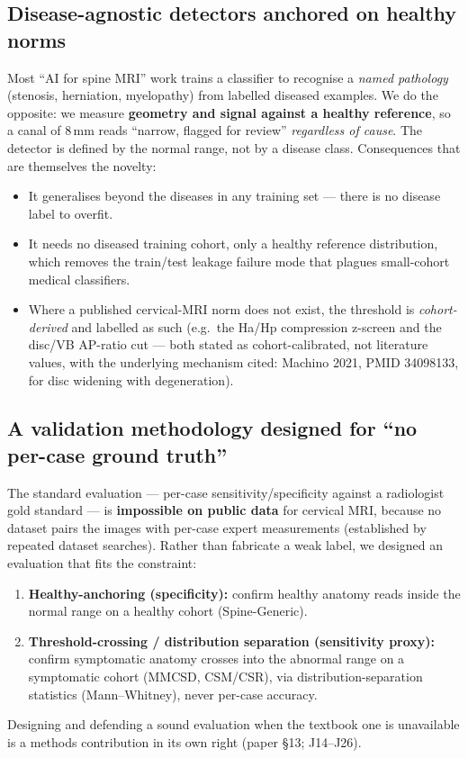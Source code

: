 \documentclass[11pt]{article}
\begin{document}
\subsection{Disease-agnostic detectors anchored on healthy norms}
Most ``AI for spine MRI'' work trains a classifier to recognise a \emph{named pathology} (stenosis,
herniation, myelopathy) from labelled diseased examples. We do the opposite: we measure
\textbf{geometry and signal against a healthy reference}, so a canal of $8$\,mm reads ``narrow,
flagged for review'' \emph{regardless of cause}. The detector is defined by the normal range, not by a
disease class. Consequences that are themselves the novelty:
\begin{itemize}
  \item It generalises beyond the diseases in any training set --- there is no disease label to overfit.
  \item It needs no diseased training cohort, only a healthy reference distribution, which removes the
  train/test leakage failure mode that plagues small-cohort medical classifiers.
  \item Where a published cervical-MRI norm does not exist, the threshold is \emph{cohort-derived} and
  labelled as such (e.g.\ the Ha/Hp compression z-screen and the disc/VB AP-ratio cut --- both stated as
  cohort-calibrated, not literature values, with the underlying mechanism cited: Machino 2021,
  PMID 34098133, for disc widening with degeneration).
\end{itemize}

\subsection{A validation methodology designed for ``no per-case ground truth''}
The standard evaluation --- per-case sensitivity/specificity against a radiologist gold standard --- is
\textbf{impossible on public data} for cervical MRI, because no dataset pairs the images with per-case
expert measurements (established by repeated dataset searches). Rather than fabricate a weak label, we
designed an evaluation that fits the constraint:
\begin{enumerate}
  \item \textbf{Healthy-anchoring (specificity):} confirm healthy anatomy reads inside the normal range
  on a healthy cohort (Spine-Generic).
  \item \textbf{Threshold-crossing / distribution separation (sensitivity proxy):} confirm symptomatic
  anatomy crosses into the abnormal range on a symptomatic cohort (MMCSD, CSM/CSR), via
  distribution-separation statistics (Mann--Whitney), never per-case accuracy.
\end{enumerate}
Designing and defending a sound evaluation when the textbook one is unavailable is a methods
contribution in its own right (paper \S13; J14--J26).
\end{document}
